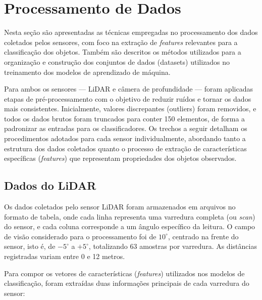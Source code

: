 \section{Processamento de Dados}

Nesta seção são apresentadas as técnicas empregadas no processamento dos dados coletados pelos sensores, com foco na extração de \textit{features} relevantes para a classificação dos objetos. Também são descritos os métodos utilizados para a organização e construção dos conjuntos de dados (datasets) utilizados no treinamento dos modelos de aprendizado de máquina.

Para ambos os sensores — LiDAR e câmera de profundidade — foram aplicadas etapas de pré-processamento com o objetivo de reduzir ruídos e tornar os dados mais consistentes. Inicialmente, valores discrepantes (outliers) foram removidos, e todos os dados brutos foram truncados para conter 150 elementos, de forma a padronizar as entradas para os classificadores. Os trechos a seguir detalham os procedimentos adotados para cada sensor individualmente, abordando tanto a estrutura dos dados coletados quanto o processo de extração de características específicas (\textit{features}) que representam propriedades dos objetos observados.

\subsection{Dados do LiDAR}

Os dados coletados pelo sensor LiDAR foram armazenados em arquivos no formato de tabela, onde cada linha representa uma varredura completa (ou \textit{scan}) do sensor, e cada coluna corresponde a um ângulo específico da leitura. O campo de visão considerado para o processamento foi de $10^\circ$, centrado na frente do sensor, isto é, de $-5^\circ$ a $+5^\circ$, totalizando 63 amostras por varredura. As distâncias registradas variam entre 0 e 12 metros.

Para compor os vetores de características (\textit{features}) utilizados nos modelos de classificação, foram extraídas duas informações principais de cada varredura do sensor:

